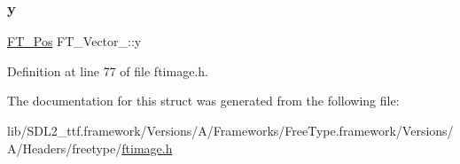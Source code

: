 \subsubsection{\texorpdfstring{y}{y}}
{\footnotesize\ttfamily \mbox{\hyperlink{ftimage_8h_af5f230f4b253d4c7715fd2e595614c90}{F\+T\+\_\+\+Pos}} F\+T\+\_\+\+Vector\+\_\+\+::y}



Definition at line 77 of file ftimage.\+h.



The documentation for this struct was generated from the following file\+:\begin{DoxyCompactItemize}
\item 
lib/\+S\+D\+L2\+\_\+ttf.\+framework/\+Versions/\+A/\+Frameworks/\+Free\+Type.\+framework/\+Versions/\+A/\+Headers/freetype/\mbox{\hyperlink{ftimage_8h}{ftimage.\+h}}\end{DoxyCompactItemize}
